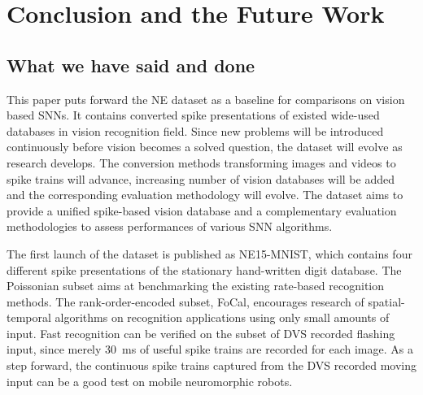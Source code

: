 \section{Conclusion and the Future Work}
\label{sec:summ}
\subsection{What we have said and done}
%
%

This paper puts forward the NE dataset as a baseline for comparisons on vision based SNNs.
It contains converted spike presentations of existed wide-used databases in vision recognition field.
Since new problems will be introduced continuously before vision becomes a solved question, the dataset will evolve as research develops. 
The conversion methods transforming images and videos to spike trains will advance, increasing number of vision databases will be added and the corresponding evaluation methodology will evolve.
The dataset aims to provide a unified spike-based vision database and a complementary evaluation methodologies to assess performances of various SNN algorithms.

The first launch of the dataset is published as NE15-MNIST, which contains four different spike presentations of the stationary hand-written digit database.
The Poissonian subset aims at benchmarking the existing rate-based recognition methods.
The rank-order-encoded subset, FoCal, encourages research of spatial-temporal algorithms on recognition applications using only small amounts of input.
Fast recognition can be verified on the subset of DVS recorded flashing input, since merely 30~ms of useful spike trains are recorded for each image.
As a step forward, the continuous spike trains captured from the DVS recorded moving input can be a good test on mobile neuromorphic robots.

